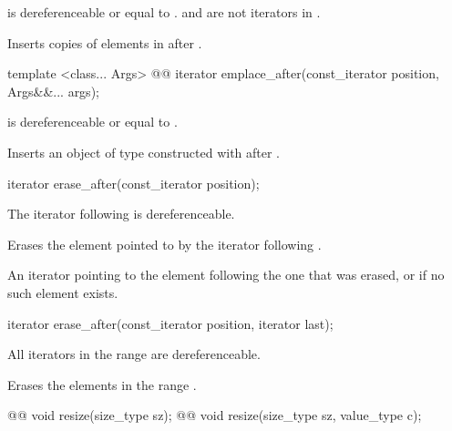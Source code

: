 \documentclass[american,twoside]{book}
\begin{document}
\begin{itemdescr}
\pnum
\requires {} is dereferenceable or equal to .  and  are not iterators in .

\pnum
\effects Inserts copies of elements in  after .
\end{itemdescr}

\begin{itemdecl}
template <class... Args>
  @@ 
  iterator emplace_after(const_iterator position, Args&&... args);
\end{itemdecl}

\begin{itemdescr}
\pnum
\requires {} is dereferenceable or equal to .

\pnum
\effects Inserts an object of type  constructed with  after .
\end{itemdescr}

\begin{itemdecl}
iterator erase_after(const_iterator position);
\end{itemdecl}

\begin{itemdescr}
\pnum
\requires The iterator following  is dereferenceable.

\pnum
\effects Erases the element pointed to by the iterator following .

\pnum
\returns An iterator pointing to the element following the one that was erased, or  if no such element exists.
\end{itemdescr}

\begin{itemdecl}
iterator erase_after(const_iterator position, iterator last);
\end{itemdecl}

\begin{itemdescr}
\pnum
\requires All iterators in the range  are dereferenceable.

\pnum
\effects Erases the elements in the range .

\pnum
\returns {}
\end{itemdescr}

\begin{itemdecl}
@@ void resize(size_type sz);
@@ void resize(size_type sz, value_type c);
\end{itemdecl}
\end{document}
